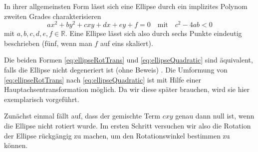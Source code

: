 In ihrer allgemeinsten Form lässt sich eine Ellipse durch ein implizites Polynom zweiten Grades charakterisieren
\begin{equation} \label{eq:ellipseQuadratic}
ax^2 + by^2 + cxy + dx + ey + f = 0 \quad \text{mit}\quad c^2-4ab < 0
\end{equation} 
mit $a,b,c,d,e,f \in \mathbb{R}$. Eine Ellipse lässt sich also durch sechs Punkte eindeutig beschrieben (fünf, wenn man $f$ auf eins skaliert).


Die beiden Formen \ref{eq:ellipseRotTrans} und \ref{eq:ellipseQuadratic} sind äquivalent, falls die Ellipse nicht degeneriert ist (ohne Beweis) \cite{Lawrence1972}. Die Umformung von \ref{eq:ellipseRotTrans} nach \ref{eq:ellipseQuadratic} ist mit Hilfe einer Hauptachsentransformation möglich. 
Da wir diese später brauchen, wird sie hier exemplarisch vorgeführt. 

Zunächst einmal fällt auf, dass der gemischte Term $cxy$ genau dann null ist, wenn die Ellipse nicht rotiert wurde. Im ersten Schritt versuchen wir also die Rotation der Ellipse rückgängig zu machen, um den Rotationswinkel bestimmen zu können.

